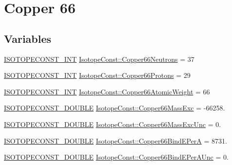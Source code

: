 \hypertarget{group___isotope_const-_copper-_cu66}{}\section{Copper 66}
\label{group___isotope_const-_copper-_cu66}
\subsection*{Variables}
\begin{DoxyCompactItemize}
\item 
\mbox{\hyperlink{group___isotope_const-_macros_ga5f18360b3e99483a35c32d789e62621c}{I\+S\+O\+T\+O\+P\+E\+C\+O\+N\+S\+T\+\_\+\+I\+NT}} \mbox{\hyperlink{group___isotope_const-_copper-_cu66_gaa65f592fb783b43b5788cb391f60de5a}{Isotope\+Const\+::\+Copper66\+Neutrons}} = 37
\item 
\mbox{\hyperlink{group___isotope_const-_macros_ga5f18360b3e99483a35c32d789e62621c}{I\+S\+O\+T\+O\+P\+E\+C\+O\+N\+S\+T\+\_\+\+I\+NT}} \mbox{\hyperlink{group___isotope_const-_copper-_cu66_ga68000e339ccd231662a5e82a4f90b6c1}{Isotope\+Const\+::\+Copper66\+Protons}} = 29
\item 
\mbox{\hyperlink{group___isotope_const-_macros_ga5f18360b3e99483a35c32d789e62621c}{I\+S\+O\+T\+O\+P\+E\+C\+O\+N\+S\+T\+\_\+\+I\+NT}} \mbox{\hyperlink{group___isotope_const-_copper-_cu66_ga08e873f2dd44265cad78634992d068a0}{Isotope\+Const\+::\+Copper66\+Atomic\+Weight}} = 66
\item 
\mbox{\hyperlink{group___isotope_const-_macros_ga8f45a7272ce02c0b4c65c44636ed719a}{I\+S\+O\+T\+O\+P\+E\+C\+O\+N\+S\+T\+\_\+\+D\+O\+U\+B\+LE}} \mbox{\hyperlink{group___isotope_const-_copper-_cu66_ga5256f8bd013f29eb5440a8cac8aadfa7}{Isotope\+Const\+::\+Copper66\+Mass\+Exc}} = -\/66258.
\item 
\mbox{\hyperlink{group___isotope_const-_macros_ga8f45a7272ce02c0b4c65c44636ed719a}{I\+S\+O\+T\+O\+P\+E\+C\+O\+N\+S\+T\+\_\+\+D\+O\+U\+B\+LE}} \mbox{\hyperlink{group___isotope_const-_copper-_cu66_ga790d7c9ea04eb3a8ee0ee89bbf6ad68c}{Isotope\+Const\+::\+Copper66\+Mass\+Exc\+Unc}} = 0.
\item 
\mbox{\hyperlink{group___isotope_const-_macros_ga8f45a7272ce02c0b4c65c44636ed719a}{I\+S\+O\+T\+O\+P\+E\+C\+O\+N\+S\+T\+\_\+\+D\+O\+U\+B\+LE}} \mbox{\hyperlink{group___isotope_const-_copper-_cu66_gabd20e99624f3aeeb57609b10a3df668b}{Isotope\+Const\+::\+Copper66\+Bind\+E\+PerA}} = 8731.
\item 
\mbox{\hyperlink{group___isotope_const-_macros_ga8f45a7272ce02c0b4c65c44636ed719a}{I\+S\+O\+T\+O\+P\+E\+C\+O\+N\+S\+T\+\_\+\+D\+O\+U\+B\+LE}} \mbox{\hyperlink{group___isotope_const-_copper-_cu66_ga19ae4745678895ecbe915cd13d78a9b0}{Isotope\+Const\+::\+Copper66\+Bind\+E\+Per\+A\+Unc}} = 0.

\end{DoxyCompactItemize}
